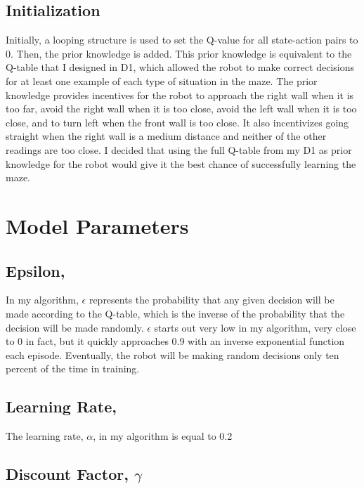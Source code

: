 \documentclass[letterpaper, 10 pt, conference]{ieeeconf}  %
\begin{document}
\subsection {Initialization}

Initially, a looping structure is used to set the Q-value for all state-action pairs to 0. Then, the prior knowledge is added. This prior knowledge is equivalent to the Q-table that I designed in D1, which allowed the robot to make correct decisions for at least one example of each type of situation in the maze. The prior knowledge provides incentives for the robot to approach the right wall when it is too far, avoid the right wall when it is too close, avoid the left wall when it is too close, and to turn left when the front wall is too close. It also incentivizes going straight when the right wall is a medium distance and neither of the other readings are too close. I decided that using the full Q-table from my D1 as prior knowledge for the robot would give it the best chance of successfully learning the maze.


\section{Model Parameters}

\subsection{Epsilon, \epsilon}

In my algorithm, $\epsilon$ represents the probability that any given decision will be made according to the Q-table, which is the inverse of the probability that the decision will be made randomly. $\epsilon$ starts out very low in my algorithm, very close to 0 in fact, but it quickly approaches 0.9 with an inverse exponential function each episode. Eventually, the robot will be making random decisions only ten percent of the time in training.

\subsection{Learning Rate, \alpha}

The learning rate, $\alpha$, in my algorithm is equal to 0.2

\subsection{Discount Factor, $\gamma$}
\end{document}
